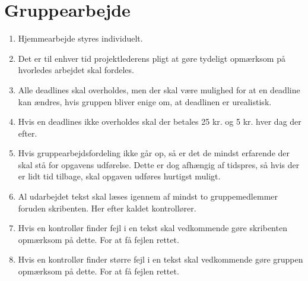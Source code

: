 \section{Gruppearbejde}
\begin{enumerate}
\item{Hjemmearbejde styres individuelt.}
\item{Det er til enhver tid projektlederens pligt at gøre tydeligt opmærksom på hvorledes arbejdet skal fordeles.}
\item{Alle deadlines skal overholdes, men der skal være mulighed for at en deadline kan ændres, hvis gruppen bliver enige om, at deadlinen er urealistisk.}
\item{Hvis en deadlines ikke overholdes skal der betales 25 kr. og 5 kr. hver dag der efter.}
\item{Hvis gruppearbejdsfordeling ikke går op, så er det de mindst erfarende der skal stå for opgavens udførelse. Dette er dog afhængig af tidspres, så hvis der er lidt tid tilbage, skal opgaven udføres hurtigst muligt. }
\item{Al udarbejdet tekst skal læses igennem af mindst to gruppemedlemmer foruden skribenten. Her
efter kaldet kontrollører.}
\item{Hvis en kontrollør finder fejl i en tekst skal vedkommende gøre skribenten opmærksom på dette.
For at få fejlen rettet.}
\item{Hvis en kontrollør finder større fejl i en tekst skal vedkommende gøre gruppen opmærksom på
dette. For at få fejlen rettet.}
\end{enumerate}
